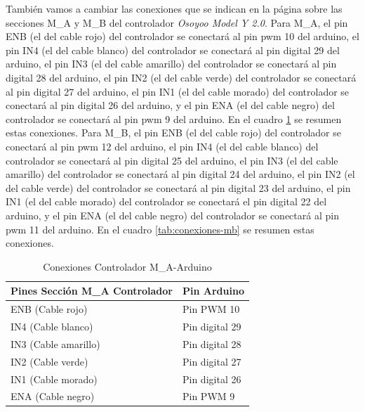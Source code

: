 \documentclass[12pt, letterpaper]{article}
\begin{document}
También vamos a cambiar las conexiones que se indican en la página sobre las secciones M\_A y M\_B del controlador \textit{Osoyoo Model Y 2.0}. Para M\_A, el pin ENB (el del cable rojo) del controlador se conectará al pin pwm 10 del arduino, el pin IN4 (el del cable blanco) del controlador se conectará al pin digital 29 del arduino, el pin IN3 (el del cable amarillo) del controlador se conectará al pin digital 28 del arduino, el pin IN2 (el del cable verde) del controlador se conectará al pin digital 27 del arduino, el pin IN1 (el del cable morado) del controlador se conectará al pin digital 26 del arduino, y el pin ENA (el del cable negro) del controlador se conectará al pin pwm 9 del arduino. En el cuadro \ref{tab:conexiones-ma} se resumen estas conexiones. Para M\_B, el pin ENB (el del cable rojo) del controlador se conectará al pin pwm 12 del arduino, el pin IN4 (el del cable blanco) del controlador se conectará al pin digital 25 del arduino, el pin IN3 (el del cable amarillo) del controlador se conectará al pin digital 24 del arduino, el pin IN2 (el del cable verde) del controlador se conectará al pin digital 23 del arduino, el pin IN1 (el del cable morado) del controlador se conectará el pin digital 22 del arduino, y el pin ENA (el del cable negro) del controlador se conectará al pin pwm 11 del arduino. En el cuadro \ref{tab:conexiones-mb} se resumen estas conexiones.

\begin{table}[h]
    \centering
    \begin{tabular}{|l|l|}
        \hline
        \textbf{Pines Sección M\_A Controlador} & \textbf{Pin Arduino} \\ \hline
        ENB (Cable rojo)               & Pin PWM 10          \\ 
        IN4 (Cable blanco)             & Pin digital 29      \\ 
        IN3 (Cable amarillo)           & Pin digital 28      \\ 
        IN2 (Cable verde)              & Pin digital 27      \\ 
        IN1 (Cable morado)             & Pin digital 26      \\ 
        ENA (Cable negro)              & Pin PWM 9           \\ \hline
    \end{tabular}
    \caption{Conexiones Controlador M\_A-Arduino}
    \label{tab:conexiones-ma}
\end{table}
\end{document}
